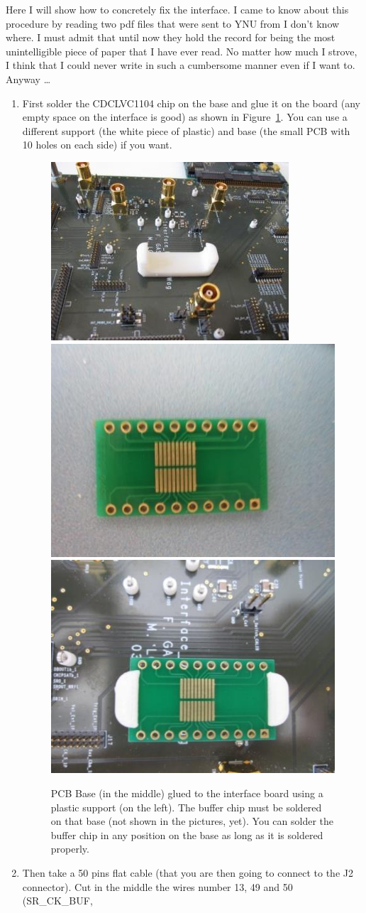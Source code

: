 Here I will show how to concretely fix the interface. I came to know about this
procedure by reading two pdf files that were sent to YNU from I don't know
where. I must admit that until now they hold the record for being the most
unintelligible piece of paper that I have ever read. No matter how much I
strove, I think that I could never write in such a cumbersome manner even if I
want to. Anyway \dots
\begin{enumerate}
\item First solder the CDCLVC1104 chip on the base and glue it on the board (any
  empty space on the interface is good) as shown in Figure~\ref{buffer}. You can
  use a different support (the white piece of plastic) and base (the small PCB
  with 10 holes on each side) if you want.
  \begin{figure}[H]
    \centering \includegraphics[frame,width=.3\textwidth]{support}\hfill
    \includegraphics[frame,width=.3\textwidth]{base}\hfill
    \includegraphics[frame,width=.3\textwidth]{base-glued}
    \caption{PCB Base (in the middle) glued to the interface board using a
      plastic support (on the left). The buffer chip must be soldered on that
      base (not shown in the pictures, yet). You can solder the buffer chip in
      any position on the base as long as it is soldered
      properly.}\label{buffer}
  \end{figure}
\item Then take a 50 pins flat cable (that you are then going to connect to the
  J2 connector). Cut in the middle the wires number 13, 49 and 50 (SR\_CK\_BUF,

\end{enumerate}
